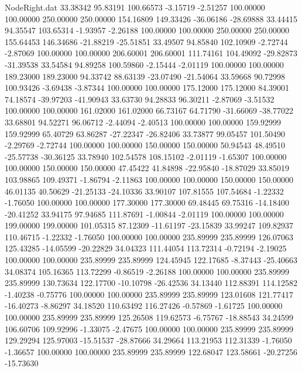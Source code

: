 \begin{filecontents}{NodeRight.dat}
  33.38342   95.83191  100.66573    -3.15719   -2.51257  100.00000  100.00000  250.00000  250.00000  154.16809  149.33426  -36.06186  -28.69888
  33.44415   94.35547  103.65314    -1.93957   -2.26188  100.00000  100.00000  250.00000  250.00000  155.64453  146.34686  -21.88219  -25.51851
  33.49507   94.85840  102.10909    -2.72744   -2.87069  100.00000  100.00000  206.60001  206.60001  111.74161  104.49092  -29.82873  -31.39538
  33.54584   94.89258  100.59860    -2.15444   -2.01119  100.00000  100.00000  189.23000  189.23000   94.33742   88.63139  -23.07490  -21.54064
  33.59668   90.72998  100.93426    -3.69438   -3.87344  100.00000  100.00000  175.12000  175.12000   84.39001   74.18574  -39.97203  -41.90943
  33.63730   94.28833   96.30211    -2.87069   -3.51532  100.00000  100.00000  161.02000  161.02000   66.73167   64.71790  -31.66069  -38.77022
  33.68801   94.52271   96.06712    -2.44094   -2.40513  100.00000  100.00000  159.92999  159.92999   65.40729   63.86287  -27.22347  -26.82406
  33.73877   99.05457  101.50490    -2.29769   -2.72744  100.00000  100.00000  150.00000  150.00000   50.94543   48.49510  -25.57738  -30.36125
  33.78940  102.54578  108.15102    -2.01119   -1.65307  100.00000  100.00000  150.00000  150.00000   47.45422   41.84898  -22.95840  -18.87029
  33.85019  103.98865  109.49371    -1.86794   -2.11863  100.00000  100.00000  150.00000  150.00000   46.01135   40.50629  -21.25133  -24.10336
  33.90107  107.81555  107.54684    -1.22332   -1.76050  100.00000  100.00000  177.30000  177.30000   69.48445   69.75316  -14.18400  -20.41252
  33.94175   97.94685  111.87691    -1.00844   -2.01119  100.00000  100.00000  199.00000  199.00000  101.05315   87.12309  -11.61197  -23.15839
  33.99247  109.82937  110.46715    -1.22332   -1.76050  100.00000  100.00000  235.89999  235.89999  126.07063  125.43285  -14.05599  -20.22829
  34.04323  111.44054  113.72314    -0.72194   -2.19025  100.00000  100.00000  235.89999  235.89999  124.45945  122.17685   -8.37443  -25.40663
  34.08374  105.16365  113.72299    -0.86519   -2.26188  100.00000  100.00000  235.89999  235.89999  130.73634  122.17700  -10.10798  -26.42536
  34.13440  112.88391  114.12582    -1.40238   -0.75776  100.00000  100.00000  235.89999  235.89999  123.01608  121.77417  -16.40273   -8.86297
  34.18520  110.63492  116.27426    -0.57869   -1.61725  100.00000  100.00000  235.89999  235.89999  125.26508  119.62573   -6.75767  -18.88543
  34.24599  106.60706  109.92996    -1.33075   -2.47675  100.00000  100.00000  235.89999  235.89999  129.29294  125.97003  -15.51537  -28.87666
  34.29664  113.21953  112.31339    -1.76050   -1.36657  100.00000  100.00000  235.89999  235.89999  122.68047  123.58661  -20.27256  -15.73630

\end{filecontents}
